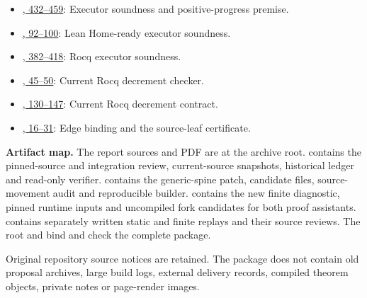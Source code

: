\begin{itemize}
\item \href{https://github.com/VladimirReshetnikov/ProveIt/blob/cbf94cb552a3b49509e0eee80e7455d4eb5974c6/Computability/BusyBeaver/Lean/BusyBeaver/ZFC/KRuntimeCore.lean#L432-L459}{, 432--459}: Executor soundness and positive-progress premise.
\item \href{https://github.com/VladimirReshetnikov/ProveIt/blob/cbf94cb552a3b49509e0eee80e7455d4eb5974c6/Computability/BusyBeaver/Lean/BusyBeaver/ZFC/KHomeReady.lean#L92-L100}{, 92--100}: Lean Home-ready executor soundness.
\item \href{https://github.com/VladimirReshetnikov/ProveIt/blob/cbf94cb552a3b49509e0eee80e7455d4eb5974c6/Computability/BusyBeaver/Research/ZFC/k225-formal/rocq/rocq-extension/coq/215/Runtime230Core.v#L382-L418}{, 382--418}: Rocq executor soundness.
\item \href{https://github.com/VladimirReshetnikov/ProveIt/blob/cbf94cb552a3b49509e0eee80e7455d4eb5974c6/Computability/BusyBeaver/Research/ZFC/k225-formal/rocq/rocq-extension/coq/215/Interpreter230Sites.v#L45-L50}{, 45--50}: Current Rocq decrement checker.
\item \href{https://github.com/VladimirReshetnikov/ProveIt/blob/cbf94cb552a3b49509e0eee80e7455d4eb5974c6/Computability/BusyBeaver/Research/ZFC/k225-formal/rocq/rocq-extension/coq/215/Interpreter230Sites.v#L130-L147}{, 130--147}: Current Rocq decrement contract.
\item \href{https://github.com/VladimirReshetnikov/ProveIt/blob/cbf94cb552a3b49509e0eee80e7455d4eb5974c6/Computability/BusyBeaver/Research/ZFC/k225-formal/rocq/rocq-extension/coq/215/Interpreter230Check.v#L16-L31}{, 16--31}: Edge binding and the source-leaf certificate.
\end{itemize}

\textbf{Artifact map.} The report sources and PDF are at the archive root.  contains the pinned-source and integration review, current-source snapshots, historical ledger and read-only verifier.  contains the generic-spine patch, candidate files, source-movement audit and reproducible builder.  contains the new finite diagnostic, pinned runtime inputs and uncompiled fork candidates for both proof assistants.  contains separately written static and finite replays and their source reviews. The root  and  bind and check the complete package.

Original repository source notices are retained. The package does not contain old proposal archives, large build logs, external delivery records, compiled theorem objects, private notes or page-render images.
